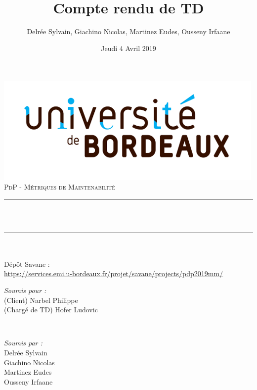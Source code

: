 \documentclass{scrartcl}
\title{Compte rendu de TD}
\author{Delrée Sylvain, Giachino Nicolas, Martinez Eudes, Ousseny Irfaane}
\date{Jeudi 4 Avril 2019}
\makeatletter
\let\thetitle\@title
\let\thedate\@date
\makeatother
\begin{document}
\begin{titlepage}
	\centering
    \vspace*{0.5 cm}
    \includegraphics[scale = 0.5]{img/logo.jpg}\\[1.0 cm]
    \textsc{\LARGE PdP - Métriques de Maintenabilité}\\[1.0 cm]
	\rule{\linewidth}{0.2 mm} \\[0.4 cm]
	{ \huge \bfseries \thetitle}\\
	\rule{\linewidth}{0.2 mm} \\[0.5 cm]
	{\small \thedate}\\[0.5 cm]
	{\small Dépôt Savane :\\ \url{https://services.emi.u-bordeaux.fr/projet/savane/projects/pdp2019mm/}}\\[1.5 cm]
	
	\begin{minipage}{0.4\textwidth}
		\begin{flushleft} \large
			\emph{Soumis pour :}\\
			(Client) Narbel Philippe\\
            (Chargé de TD) Hofer Ludovic\\
		\end{flushleft}
	\end{minipage}~
	\begin{minipage}{0.4\textwidth}
        \begin{flushright} \large
			\emph{Soumis par :} \\
			Delrée Sylvain\\
            Giachino Nicolas\\
            Martinez Eudes\\
            Ousseny Irfaane\\
		\end{flushright}
	\end{minipage}\\[2 cm]
	
\end{titlepage}
\end{document}
